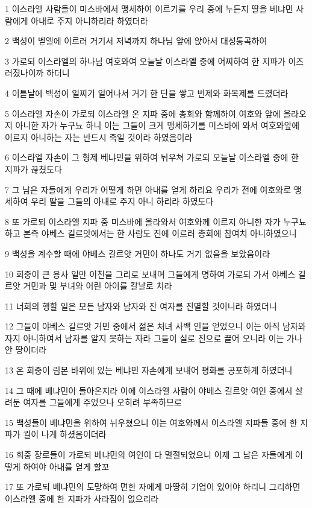 \par 1 이스라엘 사람들이 미스바에서 맹세하여 이르기를 우리 중에 누든지 딸을 베냐민 사람에게 아내로 주지 아니하리라 하였더라
\par 2 백성이 벧엘에 이르러 거기서 저녁까지 하나님 앞에 앉아서 대성통곡하여
\par 3 가로되 이스라엘의 하나님 여호와여 오늘날 이스라엘 중에 어찌하여 한 지파가 이즈러졌나이까 하더니
\par 4 이튿날에 백성이 일찌기 일어나서 거기 한 단을 쌓고 번제와 화목제를 드렸더라
\par 5 이스라엘 자손이 가로되 이스라엘 온 지파 중에 총회와 함께하여 여호와 앞에 올라오지 아니한 자가 누구뇨 하니 이는 그들이 크게 맹세하기를 미스바에 와서 여호와앞에 이르지 아니하는 자는 반드시 죽일 것이라 하였음이라
\par 6 이스라엘 자손이 그 형제 베냐민을 위하여 뉘우쳐 가로되 오늘날 이스라엘 중에 한 지파가 끊쳤도다
\par 7 그 남은 자들에게 우리가 어떻게 하면 아내를 얻게 하리요 우리가 전에 여호와로 맹세하여 우리 딸을 그들의 아내로 주지 아니 하리라 하였도다
\par 8 또 가로되 이스라엘 지파 중 미스바에 올라와서 여호와께 이르지 아니한 자가 누구뇨 하고 본즉 야베스 길르앗에서는 한 사람도 진에 이르러 총회에 참여치 아니하였으니
\par 9 백성을 계수할 때에 야베스 길르앗 거민이 하나도 거기 없음을 보았음이라
\par 10 회중이 큰 용사 일만 이천을 그리로 보내며 그들에게 명하여 가로되 가서 야베스 길르앗 거민과 및 부녀와 어린 아이를 칼날로 치라
\par 11 너희의 행할 일은 모든 남자와 남자와 잔 여자를 진멸할 것이니라 하였더니
\par 12 그들이 야베스 길르앗 거민 중에서 젊은 처녀 사백 인을 얻었으니 이는 아직 남자와 자지 아니하여서 남자를 알지 못하는 자라 그들이 실로 진으로 끌어 오니라 이는 가나안 땅이더라
\par 13 온 회중이 림몬 바위에 있는 베냐민 자손에게 보내어 평화를 공포하게 하였더니
\par 14 그 때에 베냐민이 돌아온지라 이에 이스라엘 사람이 야베스 길르앗 여인 중에서 살려둔 여자를 그들에게 주었으나 오히려 부족하므로
\par 15 백성들이 베냐민을 위하여 뉘우쳤으니 이는 여호와께서 이스라엘 지파들 중에 한 지파가 궐이 나게 하셨음이더라
\par 16 회중 장로들이 가로되 베냐민의 여인이 다 멸절되었으니 이제 그 남은 자들에게 어떻게 하여야 아내를 얻게 할꼬
\par 17 또 가로되 베냐민의 도망하여 면한 자에게 마땅히 기업이 있어야 하리니 그리하면 이스라엘 중에 한 지파가 사라짐이 없으리라
